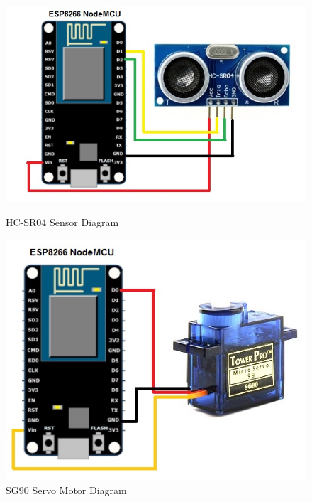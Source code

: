 \documentclass[sigconf]{acmart}
\begin{document}
\begin{figure}[htb]
	\includegraphics[width=1.0\columnwidth]{images/Ultrasonic-sensor.jpg}
	\caption{HC-SR04 Sensor Diagram}\label{F:usensor}

	\includegraphics[width=1.0\columnwidth]{images/SG90-servo.jpg}
	\caption{SG90 Servo Motor Diagram}\label{F:sg90}


\end{figure}
\end{document}
